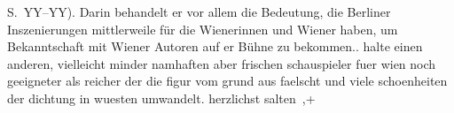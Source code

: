\begin{ledgroupsized}[t]{13cm}
{{{                     S. YY–YY). Darin behandelt er vor allem die Bedeutung, die Berliner Inszenierungen mittlerweile für die
                     Wienerinnen und Wiener haben, um Bekanntschaft mit Wiener Autoren auf er Bühne zu bekommen.}}}\label{K_L03420-1h}. halte einen
               anderen, vielleicht minder namhaften aber frischen schauspieler fuer {\pb}wien noch geeigneter als reicher der die figur vom grund aus faelscht und viele
               schoenheiten der dichtung in wuesten umwandelt.\pend
           \pstart herzlichst \spacefill\mbox{salten ,+}\pend{}
         
         \endnumbering{}\end{ledgroupsized}\begin{anhang}\end{anhang}\newcommand{\dateiname}{L03420}\newcommand{\titel}{Felix Salten an Arthur Schnitzler, 21. 4. [1906]}\newcommand{\editorInnen}{Martin Anton Müller und Laura Untner}
      
